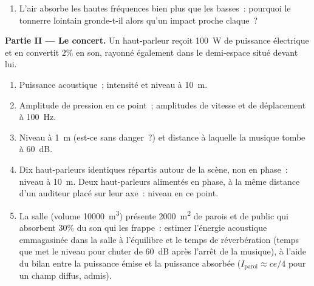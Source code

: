 \begin{problem}
\begin{enumerate}
  \item L'air absorbe les hautes fréquences bien plus que les basses~: pourquoi
        le tonnerre lointain gronde-t-il alors qu'un impact proche claque~?
\end{enumerate}

\medskip
\noindent\textbf{Partie II --- Le concert.}
Un haut-parleur reçoit \qty{100}{W} de puissance électrique et en convertit
$2\%$ en son, rayonné également dans le demi-espace situé devant
lui.
\begin{enumerate}[resume]
  \item Puissance acoustique~; intensité et niveau à \qty{10}{m}.
  \item Amplitude de pression en ce point~; amplitudes de vitesse et de déplacement
        à \qty{100}{Hz}.
  \item Niveau à \qty{1}{m} (est-ce sans danger~?) et distance à laquelle la musique
        tombe à \qty{60}{dB}.
  \item Dix haut-parleurs identiques répartis autour de la scène, non
        en phase~: niveau à \qty{10}{m}. Deux haut-parleurs alimentés en phase, à la
        même distance d'un auditeur placé sur leur axe~: niveau en ce point.
  \item La salle (volume \qty{10000}{m^3}) présente \qty{2000}{m^2} de parois et de public qui absorbent $30\%$ du
        son qui les frappe~: estimer l'énergie acoustique emmagasinée dans la
        salle à l'équilibre et le temps de réverbération (temps que met le
        niveau pour chuter de \qty{60}{dB} après l'arrêt de la musique), à l'aide du
        bilan entre la puissance émise et la puissance absorbée
        ($I_{\text{paroi}} \approx ce/4$ pour un champ diffus, admis).
\end{enumerate}


\end{problem}
